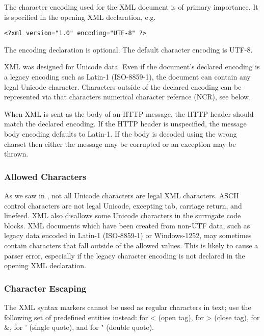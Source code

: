 The character encoding used for the XML document is of primary importance.
It is specified in the opening XML declaration, e.g.
\begin{verbatim} 
<?xml version="1.0" encoding="UTF-8" ?>
\end{verbatim}  
The encoding declaration is optional.
The default character encoding is UTF-8.

XML was designed for Unicode data.
Even if the document's declared encoding is a 
legacy encoding such as Latin-1 (ISO-8859-1),
the document can contain any legal Unicode character.
Characters outside of the declared encoding can be represented 
via that characters numerical character refernce (NCR), see below.

When XML is sent as the body of an HTTP message, the HTTP  
header should match the declared encoding.  If the HTTP  header
is unspecified, the message body encoding defaults to Latin-1.
If the body is decoded using the wrong charset then either the message may be
corrupted or an exception may be thrown.


\subsubsection{Allowed Characters}

As we saw in , not all Unicode characters are legal XML characters.
ASCII control characters are not legal Unicode, excepting tab, carriage return, and linefeed.
XML also disallows some Unicode characters in the surrogate code blocks.
XML documents which have been created from non-UTF data, such as legacy data
encoded in Latin-1 (ISO-8859-1) or Windows-1252, 
may sometimes contain characters that fall outside of the allowed values.
This is likely to cause a parser error, especially if the legacy character encoding
is not declared in the opening XML declaration.


\subsubsection{Character Escaping}\label{section:xml-escape-codes}

The XML syntax markers cannot be used as regular characters in text; 
use the following set of predefined entities instead:
 for < (open tag),  for > (close tag),  for \&,
 for ' (single quote), and  for " (double quote).

